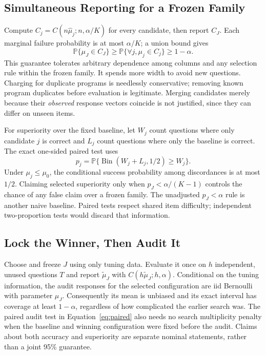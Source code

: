 \documentclass{article}
\newcommand{\Prob}{\mathbb{P}}
\newcommand{\muh}{\widehat\mu}
\begin{document}
\subsection{Simultaneous Reporting for a Frozen Family}
Compute $C_j=C(n\muh_j;n,\alpha/K)$ for every candidate, then report $C_J$. Each marginal failure probability is at most $\alpha/K$; a union bound gives
\begin{equation}
 \Prob\{\mu_J\in C_J\}\geq
 \Prob\{\forall j,\mu_j\in C_j\}\geq1-\alpha.
 \label{eq:simultaneous}
\end{equation}
This guarantee tolerates arbitrary dependence among columns and any selection rule within the frozen family. It spends more width to avoid new questions. Charging for duplicate programs is needlessly conservative; removing known program duplicates before evaluation is legitimate. Merging candidates merely because their \emph{observed} response vectors coincide is not justified, since they can differ on unseen items.

For superiority over the fixed baseline, let $W_j$ count questions where only candidate $j$ is correct and $L_j$ count questions where only the baseline is correct. The exact one-sided paired test uses
\begin{equation}
 p_j=\Prob\{\operatorname{Bin}(W_j+L_j,1/2)\geq W_j\}.
 \label{eq:paired}
\end{equation}
Under $\mu_j\leq\mu_0$, the conditional success probability among discordances is at most $1/2$. Claiming selected superiority only when $p_J<\alpha/(K-1)$ controls the chance of any false claim over a frozen family. The unadjusted $p_J<\alpha$ rule is another naive baseline. Paired tests respect shared item difficulty; independent two-proportion tests would discard that information.

\subsection{Lock the Winner, Then Audit It}
Choose and freeze $J$ using only tuning data. Evaluate it once on $h$ independent, unused questions $T$ and report $\widetilde\mu_J$ with $C(h\widetilde\mu_J;h,\alpha)$. Conditional on the tuning information, the audit responses for the selected configuration are iid Bernoulli with parameter $\mu_J$. Consequently its mean is unbiased and its exact interval has coverage at least $1-\alpha$, regardless of how complicated the earlier search was. The paired audit test in Equation~\eqref{eq:paired} also needs no search multiplicity penalty when the baseline and winning configuration were fixed before the audit. Claims about both accuracy and superiority are separate nominal statements, rather than a joint 95\% guarantee.
\end{document}
